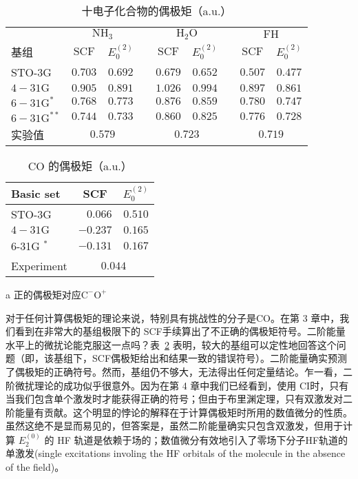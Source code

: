\begin{table}
	\centering
	\caption{十电子化合物的偶极矩（a.u.）}
	\begin{tabular}{lcccccccc}
		\hline & \multicolumn{2}{c}{$\mathrm{NH}_3$} & & \multicolumn{2}{c}{$\mathrm{H}_2 \mathrm{O}$} & & \multicolumn{2}{c}{$\mathrm{FH}$} \\
		\cline { 2 - 3 } \cline { 8 - 9 } \cline { 8 - 9 } 基组 & $\mathrm{SCF}$ & $E_0^{(2)}$ & & $\mathrm{SCF}$ & $E_0^{(2)}$ & & $\mathrm{SCF}$ & $E_0^{(2)}$ \\
		\hline STO-3G & $0.703$ & $0.692$ & & $0.679$ & $0.652$ & & $0.507$ & $0.477$ \\
		$4-31 \mathrm{G}$ & $0.905$ & $0.891$ & & $1.026$ & $0.994$ & & $0.897$ & $0.861$ \\
		$6-31 \mathrm{G}^*$ & $0.768$ & $0.773$ & & $0.876$ & $0.859$ & & $0.780$ & $0.747$ \\
		$6-31 \mathrm{G}^{* *}$ & $0.744$ & $0.733$ & & $0.860$ & $0.825$ & & $0.776$ & $0.728$ \\
		实验值 & \multicolumn{2}{c}{$0.579$} & & \multicolumn{2}{c}{$0.723$} & & \multicolumn{2}{c}{$0.719$} \\
		\hline
	\end{tabular}
	\label{tab:6.10}
\end{table}

\begin{table}
	\centering
	\caption{CO 的偶极矩（a.u.）}
	\begin{threeparttable}
		\begin{tabular}{lrc}
			\hline Basic set & \multicolumn{1}{c}{ SCF } & $E_0^{(2)}$ \\
			\hline STO-3G & $0.066$ & $0.510$ \\
			$4-31 \mathrm{G}$ & $-0.237$ & $0.165$ \\
			6-31G $^*$ & $-0.131$ & $0.167$ \\
			Experiment & \multicolumn{2}{c}{$0.044$} \\
			\hline
		\end{tabular}
		\begin{tablenotes}
			\item[a] 正的偶极矩对应$\mathrm{C^-O^+}$
		\end{tablenotes}
	\end{threeparttable}
	\label{tab:6.11}
\end{table}

对于任何计算偶极矩的理论来说，特别具有挑战性的分子是CO。在第 3 章中，我们看到在非常大的基组极限下的 SCF手续算出了不正确的偶极矩符号。二阶能量水平上的微扰论能克服这一点吗？表~\ref{tab:6.11} 表明，较大的基组可以定性地回答这个问题（即，该基组下，SCF偶极矩给出和结果一致的错误符号）。二阶能量确实预测了偶极矩的正确符号。然而，基组仍不够大，无法得出任何定量结论。乍一看，二阶微扰理论的成功似乎很意外。因为在第 4 章中我们已经看到，使用 CI时，只有当我们包含单个激发时才能获得正确的符号；但由于布里渊定理，只有双激发对二阶能量有贡献。这个明显的悖论的解释在于计算偶极矩时所用的数值微分的性质。虽然这绝不是显而易见的，但答案是，虽然二阶能量确实只包含双激发，但用于计算 $E_2^{(0)}$ 的 HF 轨道是依赖于场的；数值微分有效地引入了零场下分子HF轨道的单激发(single excitations involing the HF orbitals of the molecule in the absence of the field)。

